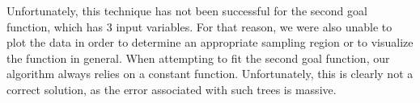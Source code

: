 Unfortunately, this technique has not been successful for the second goal function, which has 3 input variables.  For that reason, we were also unable to plot the data in order to determine an appropriate sampling region or to visualize the function in general.  When attempting to fit the second goal function, our algorithm always relies on a constant function.  Unfortunately, this is clearly not a correct solution, as the error associated with such trees is massive.







